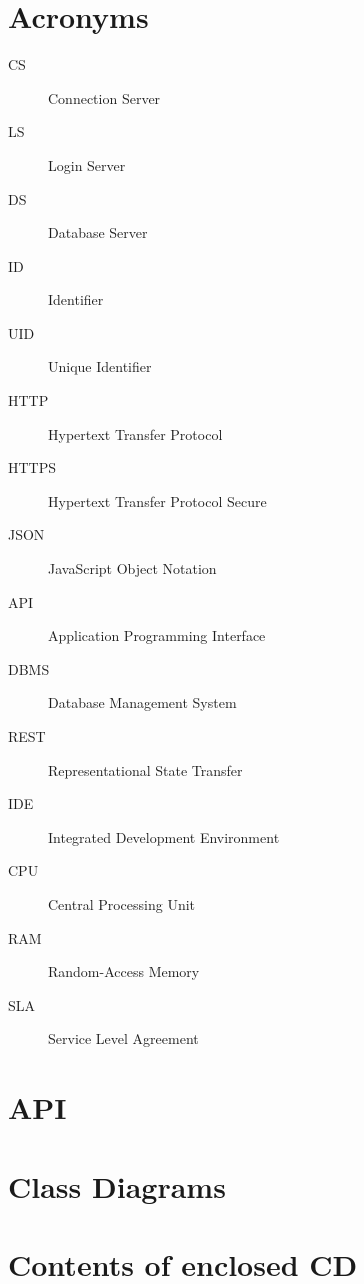 \documentclass[thesis=B,english]{FITthesis}[2012/10/20]
\begin{document}
	\chapter{Acronyms}
	\begin{description}
		\item[CS] Connection Server
		\item[LS] Login Server
		\item[DS] Database Server
		\item[ID] Identifier
		\item[UID] Unique Identifier
		\item[HTTP] Hypertext Transfer Protocol
		\item[HTTPS] Hypertext Transfer Protocol Secure
		\item[JSON] JavaScript Object Notation
		\item[API] Application Programming Interface
		\item[DBMS] Database Management System
		\item[REST] Representational State Transfer
		\item[IDE] Integrated Development Environment
		\item[CPU] Central Processing Unit
		\item[RAM] Random-Access Memory
		\item[SLA] Service Level Agreement
	\end{description}
	
	\chapter{API}
	\label{appendix:api}
	
	\chapter{Class Diagrams}
	\label{appendix:classdiagrams}
	
	\chapter{Contents of enclosed CD}
	
	
	\begin{figure}
	\end{figure}
	
\end{document}

